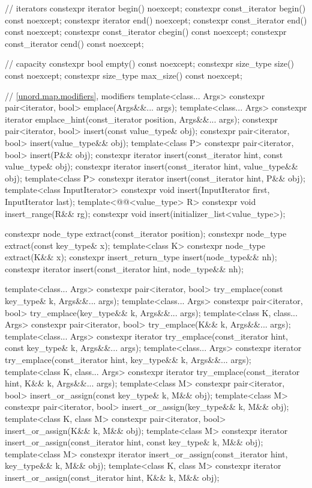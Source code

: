 \begin{codeblock}
{{    // iterators
    constexpr iterator       begin() noexcept;
    constexpr const_iterator begin() const noexcept;
    constexpr iterator       end() noexcept;
    constexpr const_iterator end() const noexcept;
    constexpr const_iterator cbegin() const noexcept;
    constexpr const_iterator cend() const noexcept;

    // capacity
    constexpr bool empty() const noexcept;
    constexpr size_type size() const noexcept;
    constexpr size_type max_size() const noexcept;

    // \ref{unord.map.modifiers}, modifiers
    template<class... Args> constexpr pair<iterator, bool> emplace(Args&&... args);
    template<class... Args>
      constexpr iterator emplace_hint(const_iterator position, Args&&... args);
    constexpr pair<iterator, bool> insert(const value_type& obj);
    constexpr pair<iterator, bool> insert(value_type&& obj);
    template<class P> constexpr pair<iterator, bool> insert(P&& obj);
    constexpr iterator       insert(const_iterator hint, const value_type& obj);
    constexpr iterator       insert(const_iterator hint, value_type&& obj);
    template<class P> constexpr iterator insert(const_iterator hint, P&& obj);
    template<class InputIterator> constexpr void insert(InputIterator first, InputIterator last);
    template<@@<value_type> R>
      constexpr void insert_range(R&& rg);
    constexpr void insert(initializer_list<value_type>);

    constexpr node_type extract(const_iterator position);
    constexpr node_type extract(const key_type& x);
    template<class K> constexpr node_type extract(K&& x);
    constexpr insert_return_type insert(node_type&& nh);
    constexpr iterator           insert(const_iterator hint, node_type&& nh);

    template<class... Args>
      constexpr pair<iterator, bool> try_emplace(const key_type& k, Args&&... args);
    template<class... Args>
      constexpr pair<iterator, bool> try_emplace(key_type&& k, Args&&... args);
    template<class K, class... Args>
      constexpr pair<iterator, bool> try_emplace(K&& k, Args&&... args);
    template<class... Args>
      constexpr iterator try_emplace(const_iterator hint, const key_type& k, Args&&... args);
    template<class... Args>
      constexpr iterator try_emplace(const_iterator hint, key_type&& k, Args&&... args);
    template<class K, class... Args>
      constexpr iterator try_emplace(const_iterator hint, K&& k, Args&&... args);
    template<class M>
      constexpr pair<iterator, bool> insert_or_assign(const key_type& k, M&& obj);
    template<class M>
      constexpr pair<iterator, bool> insert_or_assign(key_type&& k, M&& obj);
    template<class K, class M>
      constexpr pair<iterator, bool> insert_or_assign(K&& k, M&& obj);
    template<class M>
      constexpr iterator insert_or_assign(const_iterator hint, const key_type& k, M&& obj);
    template<class M>
      constexpr iterator insert_or_assign(const_iterator hint, key_type&& k, M&& obj);
    template<class K, class M>
      constexpr iterator insert_or_assign(const_iterator hint, K&& k, M&& obj);

}}
\end{codeblock}
